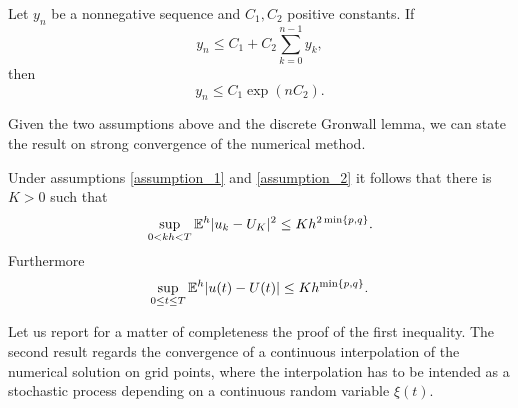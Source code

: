 \begin{lemma}\label{thm:Gronwall} Let $y_n$ be a nonnegative sequence and $C_1, C_2$ positive constants. If
	\begin{equation}
	y_n \leq C_1 + C_2 \sum_{k=0}^{n-1} y_k,
	\end{equation}
	then 
	\begin{equation}
	y_n \leq C_1 \exp(nC_2).
	\end{equation}
\end{lemma}
\noindent Given the two assumptions above and the discrete Gronwall lemma, we can state the result on strong convergence of the numerical method. 
\begin{theorem}\label{thm:strongConv} Under assumptions \ref{assumption_1} and \ref{assumption_2} it follows that there is $K>0$ such that
\begin{equation}\label{strongConvDisc}
	\sup_{0<kh<T} \mathbb{E}^h|u_k - U_K|^2 \leq Kh^{2\min\{p,q\}}.
\end{equation}
Furthermore
\begin{equation}\label{strongConvCont}
	\sup_{0\leq t \leq T} \mathbb{E}^h|u(t) - U(t)| \leq Kh^{\min\{p, q\}}.
\end{equation}
\end{theorem}
\noindent Let us report for a matter of completeness the proof of the first inequality. The second result regards the convergence of a continuous interpolation of the numerical solution on grid points, where the interpolation has to be intended as a stochastic process depending on a continuous random variable $\xi(t)$. 
